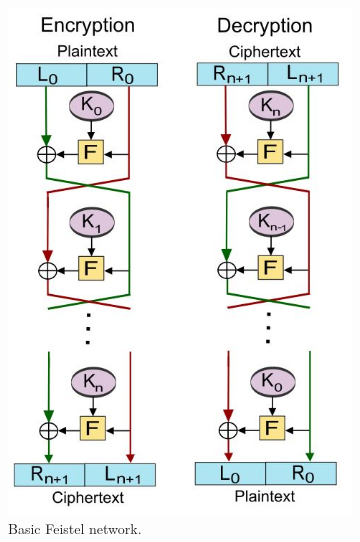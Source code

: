 \documentclass[12pt,twoside,a4paper]{report}
\begin{document}
    \begin{figure}[H]
    \begin{subfigure}[H]{0.5\textwidth}
            \includegraphics[width=\textwidth]{Feistel}
            \centering
            \caption{Basic Feistel network.}
            \label{Feistel}
    \end{subfigure}
    \begin{subfigure}[H]{0.5\textwidth}

\end{subfigure}
\end{figure}
\end{document}
